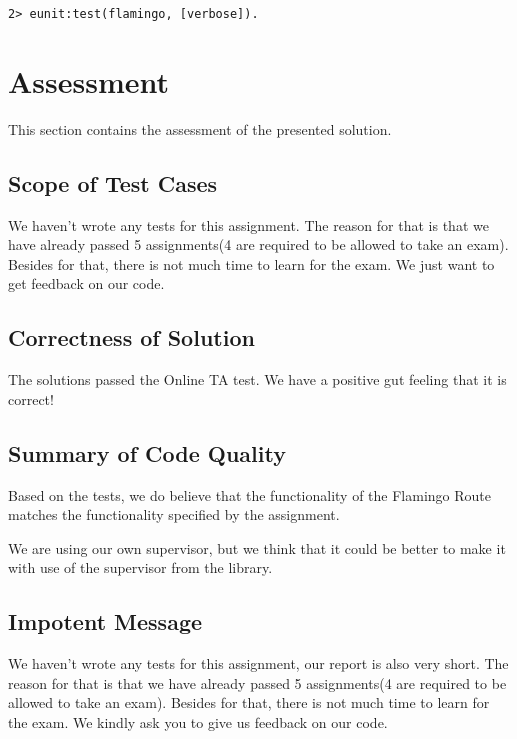 \documentclass[11pt, a4paper]{article}
\begin{document}
\begin{verbatim}
2> eunit:test(flamingo, [verbose]).
\end{verbatim}




\section{Assessment}
This section contains the assessment of the presented solution.


\subsection{Scope of Test Cases}
We haven't wrote any tests for this assignment. The reason for that is that we have already passed 5 assignments(4 are required to be allowed to take an exam). Besides for that, there is not much time to learn for the exam. We just want to get feedback on our code.  

\subsection{Correctness of Solution}
The solutions passed the Online TA test. We  have a positive gut feeling that it is correct! 

\subsection{Summary of Code Quality}
Based on the tests, we do believe that the functionality of the Flamingo Route matches the functionality specified by the assignment.

\noindent We are using our own supervisor, but we think that it could be better to make it with use of the supervisor from the library. 
\\
\subsection{Impotent Message}
\noindent We haven't wrote any tests for this assignment, our report is also very short. The reason for that is that we have already passed 5 assignments(4 are required to be allowed to take an exam). Besides for that, there is not much time to learn for the exam. We kindly ask you to give us feedback on our code.  
\end{document}
